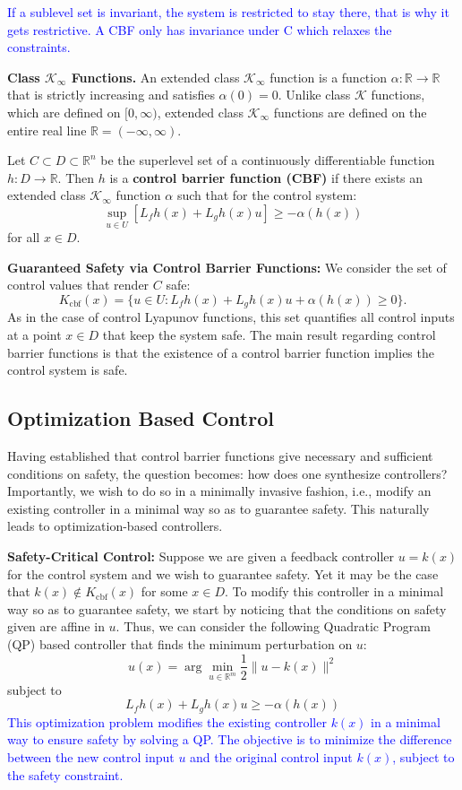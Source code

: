 \documentclass[12pt]{article}
\begin{document}
\textcolor{blue}{
If a sublevel set is invariant, the system is restricted to stay there, that is why it gets restrictive. A CBF only has invariance under C which relaxes the constraints.
}

\textbf{Class \( \mathcal{K}_\infty \) Functions.}
An extended class \( \mathcal{K}_\infty \) function is a function \( \alpha : \mathbb{R} \to \mathbb{R} \) that is strictly increasing and satisfies \( \alpha(0) = 0 \). Unlike class \( \mathcal{K} \) functions, which are defined on \([0, \infty)\), extended class \( \mathcal{K}_\infty \) functions are defined on the entire real line \(\mathbb{R} = (-\infty, \infty)\).

\begin{definition}
Let \( C \subset D \subset \mathbb{R}^n \) be the superlevel set of a continuously differentiable function \( h : D \to \mathbb{R} \). Then \( h \) is a \textbf{control barrier function (CBF)} if there exists an extended class \( \mathcal{K}_\infty \) function \( \alpha \) such that for the control system:
\[
\sup_{u \in U} [L_f h(x) + L_g h(x) u] \geq -\alpha(h(x))
\]
for all \( x \in D \).
\end{definition}

\textbf{Guaranteed Safety via Control Barrier Functions:}
We consider the set of control values that render \( C \) safe:
\[
K_{\text{cbf}}(x) = \{ u \in U : L_f h(x) + L_g h(x) u + \alpha(h(x)) \geq 0 \}.
\]
As in the case of control Lyapunov functions, this set quantifies all control inputs at a point \( x \in D \) that keep the system safe. The main result regarding control barrier functions is that the existence of a control barrier function implies the control system is safe.

\subsection{Optimization Based Control}
Having established that control barrier functions give necessary and sufficient conditions on safety, the question becomes: how does one synthesize controllers? Importantly, we wish to do so in a minimally invasive fashion, i.e., modify an existing controller in a minimal way so as to guarantee safety. This naturally leads to optimization-based controllers.

\textbf{Safety-Critical Control:}
Suppose we are given a feedback controller \( u = k(x) \) for the control system and we wish to guarantee safety. Yet it may be the case that \( k(x) \notin K_{\text{cbf}}(x) \) for some \( x \in D \). To modify this controller in a minimal way so as to guarantee safety, we start by noticing that the conditions on safety given are affine in \( u \). Thus, we can consider the following Quadratic Program (QP) based controller that finds the minimum perturbation on \( u \):
\[
u(x) = \arg\min_{u \in \mathbb{R}^m} \frac{1}{2} \|u - k(x)\|^2
\]
subject to
\[
L_f h(x) + L_g h(x) u \geq -\alpha(h(x))
\]
\textcolor{blue}{
This optimization problem modifies the existing controller \( k(x) \) in a minimal way to ensure safety by solving a QP. The objective is to minimize the difference between the new control input \( u \) and the original control input \( k(x) \), subject to the safety constraint.
}
\end{document}

